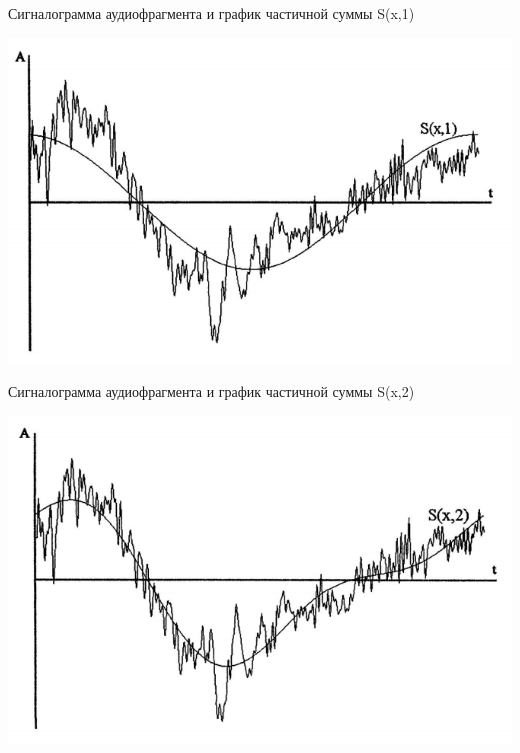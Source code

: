\documentclass{beamer}
\begin{document}
\begin{frame}
\begin{block}{Сигналограмма аудиофрагмента и график частичной суммы S(x,1)}
\begin{center}
\includegraphics[scale=0.6]{pic-specter-05}
\end{center}
\end{block}
\end{frame} 

\begin{frame}
\begin{block}{Сигналограмма аудиофрагмента и график частичной суммы S(x,2)}
\begin{center}
\includegraphics[scale=0.6]{pic-specter-06}
\end{center}
\end{block}
\end{frame} 
\end{document}
